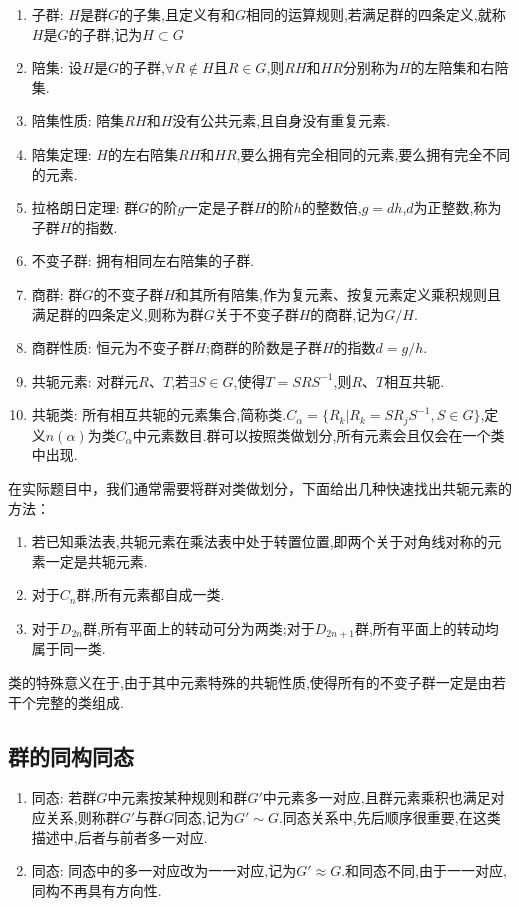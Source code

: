 \documentclass{ctexart}
\begin{document}
\begin{enumerate}
    \item 子群: $H$是群$G$的子集,且定义有和$G$相同的运算规则,若满足群的四条定义,就称$H$是$G$的子群,记为$H\subset G$
    \item 陪集: 设$H$是$G$的子群,$\forall R \notin H$且$R\in G$,则$RH$和$HR$分别称为$H$的左陪集和右陪集.
    \item 陪集性质: 陪集$RH$和$H$没有公共元素,且自身没有重复元素.
    \item 陪集定理: $H$的左右陪集$RH$和$HR$,要么拥有完全相同的元素,要么拥有完全不同的元素.
    \item 拉格朗日定理: 群$G$的阶$g$一定是子群$H$的阶$h$的整数倍,$g=dh$,$d$为正整数,称为子群$H$的指数.
    \item 不变子群: 拥有相同左右陪集的子群.
    \item 商群: 群$G$的不变子群$H$和其所有陪集,作为复元素、按复元素定义乘积规则且满足群的四条定义,则称为群$G$关于不变子群$H$的商群,记为$G/H$.
    \item 商群性质: 恒元为不变子群$H$;商群的阶数是子群$H$的指数$d=g/h$.
    \item 共轭元素: 对群元$R$、$T$,若$\exists S\in G$,使得$T=SRS^{-1}$,则$R$、$T$相互共轭.
    \item 共轭类: 所有相互共轭的元素集合,简称类.$C_{\alpha}= \{ R_{k}|R_{k}=SR_{j}S^{-1},S\in G \} $,定义$n(\alpha)$为类$C_{\alpha}$中元素数目.群可以按照类做划分,所有元素会且仅会在一个类中出现.
\end{enumerate}

在实际题目中，我们通常需要将群对类做划分，下面给出几种快速找出共轭元素的方法：
\begin{enumerate}
    \item 若已知乘法表,共轭元素在乘法表中处于转置位置,即两个关于对角线对称的元素一定是共轭元素.
    \item 对于$C_{n}$群,所有元素都自成一类.
    \item 对于$D_{2n}$群,所有平面上的转动可分为两类;对于$D_{2n+1}$群,所有平面上的转动均属于同一类.
\end{enumerate}

类的特殊意义在于,由于其中元素特殊的共轭性质,使得所有的不变子群一定是由若干个完整的类组成.

\subsection{群的同构同态}

\begin{enumerate}
    \item 同态: 若群$G$中元素按某种规则和群$G'$中元素多一对应,且群元素乘积也满足对应关系,则称群$G'$与群$G$同态,记为$G'\sim G$.同态关系中,先后顺序很重要,在这类描述中,后者与前者多一对应.
    \item 同态: 同态中的多一对应改为一一对应,记为$G'\approx G$.和同态不同,由于一一对应,同构不再具有方向性.
\end{enumerate}
\end{document}
